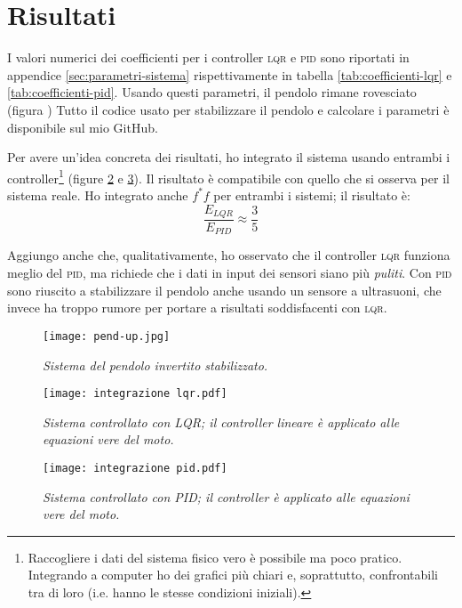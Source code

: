 \section{Risultati}\label{sec:risultati}
I valori numerici dei coefficienti per i controller \textsc{lqr} e \textsc{pid} sono riportati in appendice \ref{sec:parametri-sistema}
rispettivamente in tabella \ref{tab:coefficienti-lqr} e \ref{tab:coefficienti-pid}.
Usando questi parametri, il pendolo rimane rovesciato (figura )%
Tutto il codice usato per stabilizzare il pendolo e calcolare i parametri è disponibile sul mio GitHub\cite{github}.

Per avere un'idea concreta dei risultati, ho integrato il sistema usando entrambi i controller\footnote{Raccogliere
i dati del sistema fisico vero è possibile ma poco pratico. Integrando a computer ho dei grafici più chiari e, soprattutto,
confrontabili tra di loro (i.e. hanno le stesse condizioni iniziali).} (figure \ref{fig:int-lqr} e \ref{fig:int-pid}).
Il risultato è compatibile con quello che si osserva per il sistema reale.
Ho integrato anche $f^*f$ per entrambi i sistemi; il risultato è:
\begin{equation}
  \frac {E_{LQR} } {E_{PID}} \approx \frac 3 5
  \label{eq:rapporto-f}
\end{equation}

Aggiungo anche che, qualitativamente, ho osservato che il controller \textsc{lqr} funziona meglio del \textsc{pid}, ma
richiede che i dati in input dei sensori siano più \emph{puliti}.
Con \textsc{pid} sono riuscito a stabilizzare il pendolo anche usando un sensore a ultrasuoni, che invece ha troppo
rumore per portare a risultati soddisfacenti con \textsc{lqr}.


\begin{figure}[h]
  \texttt{[image: pend-up.jpg]}
  \caption{\emph{Sistema del pendolo invertito stabilizzato.}}
  \label{fig:pend-up}
\end{figure}

\begin{figure}[h]
  \texttt{[image: integrazione lqr.pdf]}
  \caption{\emph{Sistema controllato con LQR; il controller lineare è applicato alle equazioni vere del moto.}}
  \label{fig:int-lqr}
\end{figure}

\begin{figure}[h]
  \texttt{[image: integrazione pid.pdf]}
  \caption{\emph{Sistema controllato con PID; il controller è applicato alle equazioni vere del moto.}}
  \label{fig:int-pid}
\end{figure}



